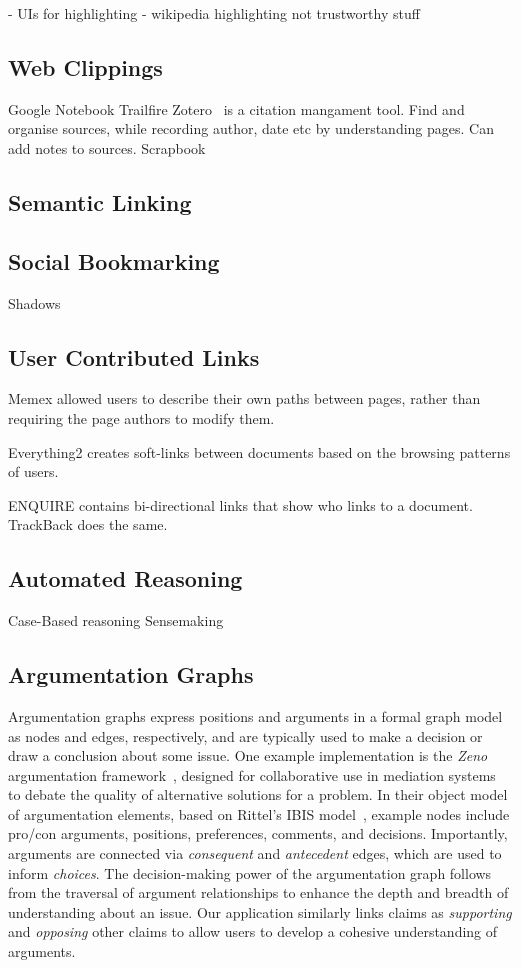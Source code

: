 \documentclass{chi2009}
\begin{document}
- UIs for highlighting
- wikipedia highlighting not trustworthy stuff

\subsection{Web Clippings}

Google Notebook
Trailfire
Zotero~\cite{zotero} is a citation mangament tool. Find and organise sources, while recording author, date etc by understanding pages. Can add notes to sources.
Scrapbook~\cite{scrapbook}

\subsection{Semantic Linking}

\subsection{Social Bookmarking}

Shadows

\subsection{User Contributed Links}

Memex allowed users to describe their own paths between pages, rather than requiring the page authors to modify them.

Everything2 creates soft-links between documents based on the browsing patterns of users.

ENQUIRE contains bi-directional links that show who links to a document. TrackBack does the same.

\subsection{Automated Reasoning}

Case-Based reasoning
Sensemaking

\subsection{Argumentation Graphs}
Argumentation graphs express positions and arguments in a formal graph model as nodes and edges, respectively, and are typically used to make a decision or draw a conclusion about some issue. One example implementation is the {\it Zeno} argumentation framework~\cite{zeno}, designed for collaborative use in mediation systems to debate the quality of alternative solutions for a problem. In their object model of argumentation elements, based on Rittel's IBIS model~\cite{ibis}, example nodes include pro/con arguments, positions, preferences, comments, and decisions. Importantly, arguments are connected via {\it consequent} and {\it antecedent} edges, which are used to inform {\it choices}. The decision-making power of the argumentation graph follows from the traversal of argument relationships to enhance the depth and breadth of understanding about an issue. Our application similarly links claims as {\it supporting} and {\it opposing} other claims to allow users to develop a cohesive understanding of arguments.
\end{document}
